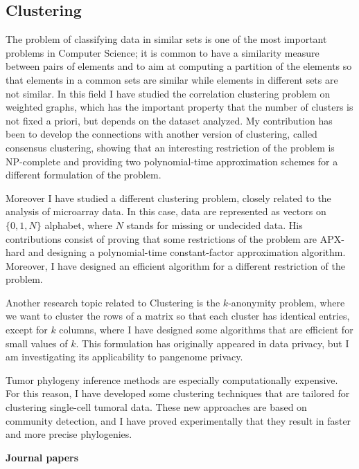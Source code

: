 \documentclass[11pt,a4paper,roman]{moderncv}
\begin{document}
\subsection{Clustering}\label{clustering}

The problem of classifying data in similar sets is one of the most
important problems in Computer Science; it is common to have a
similarity measure between pairs of elements and to aim at computing a
partition of the elements so that elements in a common sets are similar
while elements in different sets are not similar. In this field
I have studied the correlation clustering
problem on weighted graphs, which has the important property that the number of
clusters is not fixed a priori, but depends on the dataset analyzed.
My contribution has been to develop the connections with another version of
clustering, called consensus clustering, showing that an
interesting restriction of the problem is NP-complete and providing two
polynomial-time approximation schemes for a different formulation of the
problem.

Moreover I have studied a different clustering problem, closely related
to the analysis of microarray data. In this case, data are represented
as vectors on \(\{0,1,N\}\) alphabet, where \(N\) stands for missing or
undecided data. His contributions consist of proving that some
restrictions of the problem are APX-hard and designing a polynomial-time
constant-factor approximation algorithm. Moreover, I have designed an
efficient algorithm for a different restriction of the problem.

Another research topic related to Clustering is the \(k\)-anonymity problem,
where we want to cluster the rows of a matrix so that each cluster has identical
entries, except for \(k\) columns, where I have designed some algorithms that
are efficient for small values of \(k\).
This formulation has originally appeared in data privacy, but I am investigating
its applicability to pangenome privacy.


Tumor phylogeny inference methods are especially computationally expensive.
For this reason, I have developed some clustering techniques that are tailored
for clustering single-cell tumoral data.
These new approaches are based on community detection, and I have proved
experimentally that they result in faster and more precise phylogenies.


\textbf{Journal papers}

\cite{chourasiaReads2VecEfficientEmbedding2023}
\cite{10.1093/gigascience/giac119}
\cite{DBLP:journals/titb/CiccolellaPBV21}
\cite{DBLP:journals/jco/BonizzoniVDP13}
\cite{DBLP:journals/tcs/BonizzoniVD12}
\cite{DBLP:journals/jco/BonizzoniVD11}
\cite{DBLP:journals/algorithmica/BonizzoniVDM10}
\cite{DBLP:journals/jcss/BonizzoniVDJ08}
\end{document}
